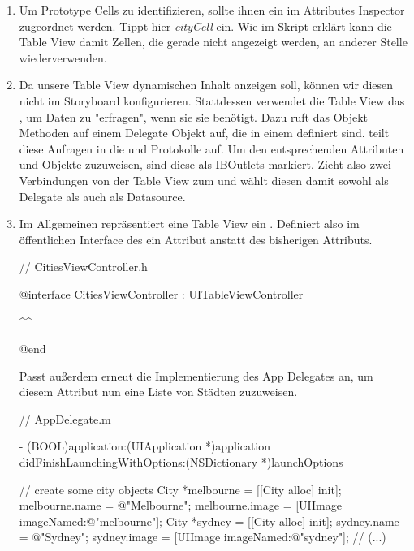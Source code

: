 \documentclass[parskip=half, final]{scrreprt}
\begin{document}
\begin{lecture}
\begin{enumerate}
\item Um Prototype Cells zu identifizieren, sollte ihnen ein  im Attributes Inspector zugeordnet werden. Tippt hier \emph{cityCell} ein. Wie im Skript erklärt kann die Table View damit Zellen, die gerade nicht angezeigt werden, an anderer Stelle wiederverwenden.

\item Da unsere Table View dynamischen Inhalt anzeigen soll, können wir diesen nicht im Storyboard konfigurieren. Stattdessen verwendet die Table View das , um Daten zu "{}erfragen"{}, wenn sie sie benötigt. Dazu ruft das  Objekt Methoden auf einem Delegate Objekt auf, die in einem  definiert sind.  teilt diese Anfragen in die  und  Protokolle auf. Um den entsprechenden Attributen  und  Objekte zuzuweisen, sind diese als IBOutlets markiert. Zieht also zwei Verbindungen von der Table View zum  und wählt diesen damit sowohl als Delegate als auch als Datasource.

\item Im Allgemeinen repräsentiert eine Table View ein . Definiert also im öffentlichen Interface des  ein Attribut  anstatt des bisherigen  Attributs.

\begin{objclst}
// CitiesViewController.h

@interface CitiesViewController : UITableViewController

^^

@end
\end{objclst}

Passt außerdem erneut die Implementierung des App Delegates an, um diesem Attribut nun eine Liste von Städten zuzuweisen.

\begin{objclst}
// AppDelegate.m

- (BOOL)application:(UIApplication *)application didFinishLaunchingWithOptions:(NSDictionary *)launchOptions
{
    // create some city objects
    City *melbourne = [[City alloc] init];
    melbourne.name = @"Melbourne";
    melbourne.image = [UIImage imageNamed:@"melbourne"];
    City *sydney = [[City alloc] init];
    sydney.name = @"Sydney";
    sydney.image = [UIImage imageNamed:@"sydney"];
    // (...)

}
\end{objclst}
\end{enumerate}
\end{lecture}
\end{document}
